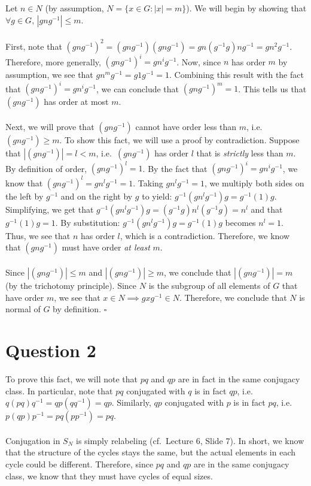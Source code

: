 \documentclass[letterpaper]{article}
\newcommand*{\QED}{\hfill\ensuremath{\square}}%
\begin{document}
Let $ n \in N $ (by assumption, $ N = \{x \in G : |x| = m\} $).
We will begin by showing that $ \forall g \in G, \, |gng^{-1}| \leq m $.
\\ \\
First, note that $ {(gng^{-1})}^2 = (gng^{-1}) (gng^{-1}) = gn(g^{-1}g)ng^{-1} = gn^{2}g^{-1} $.
Therefore, more generally, $ {(gng^{-1})}^i = gn^{i}g^{-1} $.
Now, since $ n $ has order $ m $ by assumption, we see that $ gn^{m}g^{-1} = g1g^{-1} = 1 $.
Combining this result with the fact that $ {(gng^{-1})}^i = gn^{i}g^{-1} $, we can conclude that $ {(gng^{-1})}^m = 1 $.
This tells us that $ {(gng^{-1})} $ has order at most $ m $.
\\ \\
Next, we will prove that $ {(gng^{-1})} $ cannot have order less than $ m $, i.e.\ $ {(gng^{-1})} \geq m $.
To show this fact, we will use a proof by contradiction.
Suppose that $ |{(gng^{-1})}| = l < m $, i.e.\ $ {(gng^{-1})} $ has order $ l $ that is \textit{strictly} less than $ m $.
By definition of order, $ {(gng^{-1})}^{l} = 1 $.
By the fact that $ {(gng^{-1})}^i = gn^{i}g^{-1} $, we know that $ {(gng^{-1})}^{l} = gn^{l}g^{-1} = 1 $.
Taking $ gn^{l}g^{-1} = 1 $, we multiply both sides on the left by $ g^{-1} $ and on the right by $ g $ to yield:
$ g^{-1}(gn^{l}g^{-1})g = g^{-1}(1)g $.
Simplifying, we get that $ g^{-1}(gn^{l}g^{-1})g = (g^{-1}g)n^{l}(g^{-1}g) = n^l $ and that $ g^{-1}(1)g = 1 $.
By substitution: $ g^{-1}(gn^{l}g^{-1})g = g^{-1}(1)g $ becomes $ n^l = 1 $.
Thus, we see that $ n $ has order $ l $, which is a contradiction.
Therefore, we know that $ {(gng^{-1})} $ must have order \textit{at least} $ m $.
\\ \\
Since $ |{(gng^{-1})}| \leq m $ and $ |{(gng^{-1})}| \geq m $, we conclude that $ |{(gng^{-1})}| = m $ (by the trichotomy principle).
Since $ N $ is the subgroup of all elements of $ G $ that have order $ m $, we see that $ x \in N \implies gxg^{-1} \in N $.
Therefore, we conclude that $ N $ is normal of $ G $ by definition.
\QED{}

\section{Question 2}
\label{sec:Question2}

To prove this fact, we will note that $ pq $ and $ qp $ are in fact in the same conjugacy class.
In particular, note that $ pq $ conjugated with $ q $ is in fact $ qp $, i.e.\ $ q (pq) q^{-1} = qp (qq^{-1}) = qp $.
Similarly, $ qp $ conjugated with $ p $ is in fact $ pq $, i.e.\ $ p (qp) p^{-1} = pq (pp^{-1}) = pq $.
\\ \\
Conjugation in $ S_N $ is simply relabeling (cf.\ Lecture 6, Slide 7).
In short, we know that the structure of the cycles stays the same, but the actual elements in each cycle could be different.
Therefore, since $ pq $ and $ qp $ are in the same conjugacy class, we know that they must have cycles of equal sizes.
\end{document}

